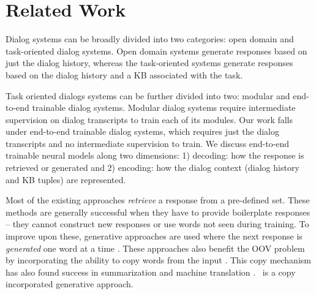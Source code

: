\section{Related Work}

Dialog systems can be broadly divided into two categories: open domain \cite{vinyals2015neural,serban2016building} and task-oriented dialog systems. Open domain systems generate responses based on just the dialog history, whereas the task-oriented systems generate responses based on the dialog history and a KB associated with the task. 

Task oriented dialogs systems can be further divided into two: modular and end-to-end trainable dialog systems. Modular dialog systems \cite{wen2017network,williams2017hybrid,williams2007partially} require intermediate supervision on dialog transcripts to train each of its modules. Our work falls under end-to-end trainable dialog systems, which requires just the dialog transcripts and no intermediate supervision to train.  We discuss end-to-end trainable neural models along two dimensions: 1) decoding: how the response is retrieved or generated and 2) encoding: how the dialog context (dialog history and KB tuples) are represented.  

Most of the existing approaches \cite{BordesW16,liu2017gated,seo2016query,wu2017end} {\em retrieve} a response from a pre-defined set. These methods are generally successful when they have to provide boilerplate responses -- they cannot construct new responses or use words not seen during training. 
To improve upon these, generative approaches are used where the next response is {\em generated} one word at a time \cite{eric2017copy,mem2seq}. These approaches also benefit the OOV problem by incorporating the ability to copy words from the input \cite{vinyals2015pointer,gu2016incorporating}. This copy mechanism has also found success in summarization \cite{nallapati2016abstractive,see2017get} and machine translation \cite{ptr-unk}. \sys\ is a copy incorporated generative approach.


